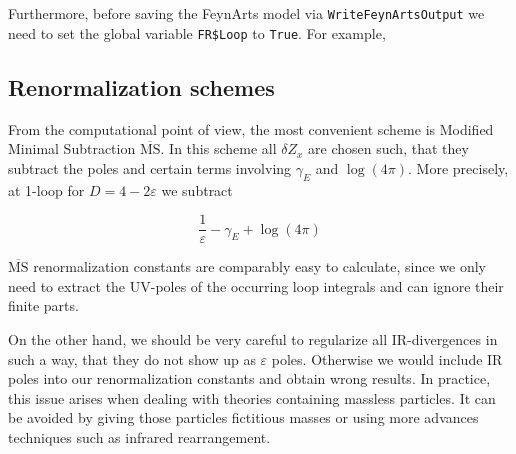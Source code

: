 \documentclass[../FeynCalcManual.tex]{subfiles}
\begin{document}
Furthermore, before saving the FeynArts model via
\texttt{WriteFeynArtsOutput} we need to set the global variable
\texttt{FR\$Loop} to \texttt{True}. For example,

\begin{Shaded}
\begin{Highlighting}[]
\ExtensionTok{=}\NormalTok{;}
\OperatorTok{[}\OperatorTok{[\{}\OperatorTok{,}\OperatorTok{,}\OperatorTok{,}\OperatorTok{,}\OperatorTok{\}]]}\NormalTok{;}
\OperatorTok{[}\OperatorTok{,}\OtherTok{{-}\textgreater{}}\OperatorTok{,}\OtherTok{{-}\textgreater{}}\OperatorTok{]}\NormalTok{;}
\end{Highlighting}
\end{Shaded}

\subsection{Renormalization schemes}\label{renormalization-schemes}

From the computational point of view, the most convenient scheme is
Modified Minimal Subtraction \(\overline{\textrm{MS}}\). In this scheme
all \(\delta Z_x\) are chosen such, that they subtract the poles and
certain terms involving \(\gamma_E\) and \(\log(4\pi)\). More precisely,
at 1-loop for \(D= 4 - 2 \varepsilon\) we subtract

\begin{equation}
\frac{1}{\varepsilon} - \gamma_E + \log (4\pi)
\end{equation}

\(\overline{\textrm{MS}}\) renormalization constants are comparably easy
to calculate, since we only need to extract the UV-poles of the
occurring loop integrals and can ignore their finite parts.

On the other hand, we should be very careful to regularize all
IR-divergences in such a way, that they do not show up as
\(\varepsilon\) poles. Otherwise we would include IR poles into our
renormalization constants and obtain wrong results. In practice, this
issue arises when dealing with theories containing massless particles.
It can be avoided by giving those particles fictitious masses or using
more advances techniques such as infrared rearrangement.
\end{document}
